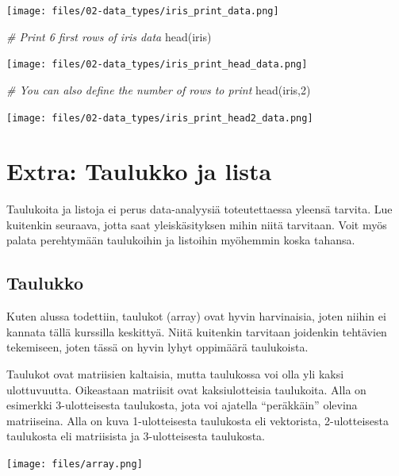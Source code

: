 \documentclass[
]{book}
\newenvironment{Shaded}{\begin{snugshade}}{\end{snugshade}}
\newcommand{\CommentTok}[1]{\textcolor[rgb]{0.56,0.35,0.01}{\textit{#1}}}
\newcommand{\DecValTok}[1]{\textcolor[rgb]{0.00,0.00,0.81}{#1}}
\newcommand{\FunctionTok}[1]{\textcolor[rgb]{0.00,0.00,0.00}{#1}}
\newcommand{\NormalTok}[1]{#1}
\begin{document}
\texttt{[image: files/02-data\_types/iris\_print\_data.png]}

\begin{Shaded}
\begin{Highlighting}[]
\CommentTok{\# Print 6 first rows of iris data}
\FunctionTok{head}\NormalTok{(iris)}
\end{Highlighting}
\end{Shaded}

\texttt{[image: files/02-data\_types/iris\_print\_head\_data.png]}

\begin{Shaded}
\begin{Highlighting}[]
\CommentTok{\# You can also define the number of rows to print}
\FunctionTok{head}\NormalTok{(iris,}\DecValTok{2}\NormalTok{)}
\end{Highlighting}
\end{Shaded}

\texttt{[image: files/02-data\_types/iris\_print\_head2\_data.png]}

\hypertarget{extra-taulukko-ja-lista}{%
\section{Extra: Taulukko ja lista}\label{extra-taulukko-ja-lista}}

Taulukoita ja listoja ei perus data-analyysiä toteutettaessa yleensä tarvita. Lue kuitenkin seuraava, jotta saat yleiskäsityksen mihin niitä tarvitaan. Voit myös palata perehtymään taulukoihin ja listoihin myöhemmin koska tahansa.

\hypertarget{array}{%
\subsection{Taulukko}\label{array}}

Kuten alussa todettiin, taulukot (array) ovat hyvin harvinaisia, joten niihin ei kannata tällä kurssilla keskittyä. Niitä kuitenkin tarvitaan joidenkin tehtävien tekemiseen, joten tässä on hyvin lyhyt oppimäärä taulukoista.

Taulukot ovat matriisien kaltaisia, mutta taulukossa voi olla yli kaksi ulottuvuutta. Oikeastaan matriisit ovat kaksiulotteisia taulukoita. Alla on esimerkki 3-ulotteisesta taulukosta, jota voi ajatella ``peräkkäin'' olevina matriiseina. Alla on kuva 1-ulotteisesta taulukosta eli vektorista, 2-ulotteisesta taulukosta eli matriisista ja 3-ulotteisesta taulukosta.

\texttt{[image: files/array.png]}
\end{document}
